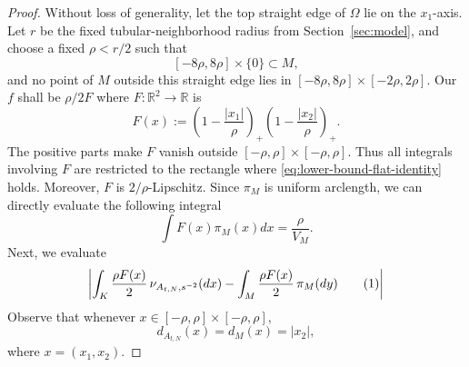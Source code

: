 \documentclass{article}
\newcommand{\R}{\mathbb R}
\numberwithin{equation}{section}
\newcommand\numberthis{\addtocounter{equation}{1}\tag{\theequation}}
\begin{document}
\begin{proof}
Without loss of generality, let the top straight edge of $\Omega$ lie on
the $x_1$-axis. Let $r$ be the fixed tubular-neighborhood
radius from Section~\ref{sec:model}, and choose a fixed $\rho<r/2$ such that
\[
 [-8\rho,8\rho]\times\{0\}\subset M,
\]
and no point of $M$ outside this straight edge lies in
$[-8\rho,8\rho]\times[-2\rho,2\rho]$. 
Our $f$ shall be $\rho/2 F$ where $F:\R^2\to\R$ is
\[
 F(x):=\left(1-\frac{|x_1|}{\rho}\right)_+
       \left(1-\frac{|x_2|}{\rho}\right)_+.
\]
The positive parts make $F$ vanish outside
$[-\rho,\rho]\times[-\rho,\rho]$. Thus all integrals involving $F$ are
restricted to the rectangle where
\eqref{eq:lower-bound-flat-identity} holds. Moreover, $F$ is
$2/\rho$-Lipschitz. Since $\pi_M$ is uniform arclength, we can directly evaluate the following integral
\[
 \int F(x)\pi_M(x)dx=\frac{\rho}{V_M}.
\]
Next, we evaluate 
\[
  \left|
 \int_K \frac{\rho F(x)}{2}\,\nu_{A_{t,N},s^{-2}}(dx)
 -\int_M \frac{\rho F(x)}{2}\,\pi_M(dy)\numberthis\label{eq:KR-lower-bound}
 \right|
 \]
Observe that whenever $x\in [-\rho,\rho]\times[-\rho,\rho]$,
\begin{equation}
 d_{A_{t,N}}(x)=d_M(x)=|x_2|,
\label{eq:lower-bound-flat-identity}
\end{equation}
where $x=(x_1,x_2)$.








\end{proof}
\end{document}
